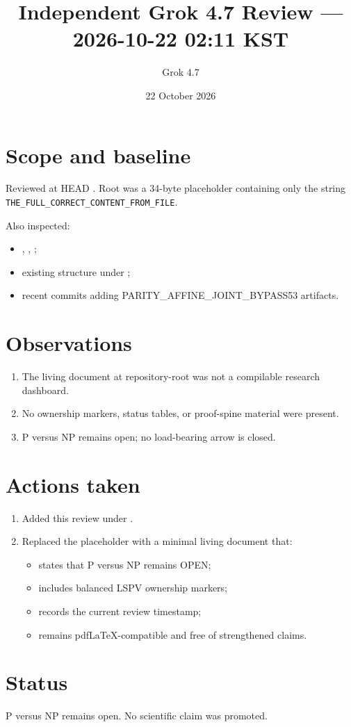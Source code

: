 \documentclass[11pt]{article}
\title{Independent Grok 4.7 Review --- 2026-10-22 02:11 KST}
\author{Grok 4.7}
\date{22 October 2026}
\begin{document}
\maketitle

\begin{center}
\end{center}

\section{Scope and baseline}
Reviewed at HEAD .
Root  was a 34-byte placeholder containing only the string \texttt{THE\_FULL\_CORRECT\_CONTENT\_FROM\_FILE}.

Also inspected:
\begin{itemize}
\item {}, , ;
\item existing structure under ;
\item recent commits adding PARITY\_AFFINE\_JOINT\_BYPASS53 artifacts.
\end{itemize}

\section{Observations}
\begin{enumerate}
\item The living document at repository-root  was not a compilable research dashboard.
\item No ownership markers, status tables, or proof-spine material were present.
\item P versus NP remains open; no load-bearing arrow is closed.
\end{enumerate}

\section{Actions taken}
\begin{enumerate}
\item Added this review under .
\item Replaced the placeholder  with a minimal living document that:
\begin{itemize}
\item states that P versus NP remains OPEN;
\item includes balanced LSPV ownership markers;
\item records the current review timestamp;
\item remains pdfLaTeX-compatible and free of strengthened claims.
\end{itemize}
\end{enumerate}

\section{Status}
P versus NP remains open. No scientific claim was promoted.

\end{document}
